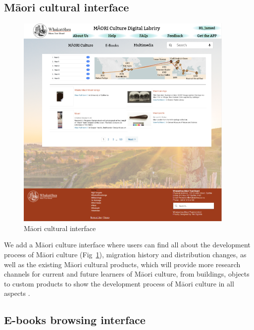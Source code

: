 \subsection{Māori cultural interface}

\begin{figure}[htbp]
  \centerline{\includegraphics[width=300pt]{images/3-1-3.png}}
  \caption{Māori cultural interface}
  \label{fig3.1.5}
\end{figure}

We add a Māori culture interface where users can find all about the development process of Māori culture (Fig~\ref{fig3.1.5}), migration history and distribution changes, as well as the existing Māori cultural products, which will provide more research channels for current and future learners of Māori culture, from buildings, objects to custom products to show the development process of Māori culture in all aspects \autocite{MāoriCul4:online}.

\subsection{E-books browsing interface}

